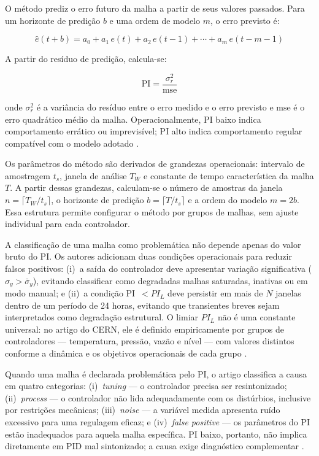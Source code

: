 O método prediz o erro futuro da malha a partir de seus valores passados. Para um horizonte de predição $b$ e uma ordem de modelo $m$, o erro previsto é:

\begin{equation}
	\hat{e}(t+b) = a_0 + a_1\,e(t) + a_2\,e(t-1) + \cdots + a_m\,e(t-m-1)
	\label{eq:pi_pred}
\end{equation}

A partir do resíduo de predição, calcula-se:

\begin{equation}
	\text{PI} = \frac{\sigma^2_r}{\text{mse}}
	\label{eq:pi_index}
\end{equation}

\noindent onde $\sigma^2_r$ é a variância do resíduo entre o erro medido e o erro previsto e
$\text{mse}$ é o erro quadrático médio da malha. Operacionalmente, PI baixo indica comportamento
errático ou imprevisível; PI alto indica comportamento regular compatível com o modelo adotado
\cite{Bradu2018}.

Os parâmetros do método são derivados de grandezas operacionais: intervalo de amostragem $t_s$, janela de análise $T_W$ e constante de tempo característica da malha $T$. A partir dessas grandezas, calculam-se o número de amostras da janela $n = \lceil T_W/t_s \rceil$, o horizonte de predição $b = \lceil T/t_s \rceil$ e a ordem do modelo $m = 2b$. Essa estrutura permite configurar o método por grupos de malhas, sem ajuste individual para cada controlador.

A classificação de uma malha como problemática não depende apenas do valor bruto do PI. Os autores adicionam duas condições operacionais para reduzir falsos positivos: (i)~a saída do controlador deve apresentar variação significativa ($\sigma_y > \bar{\sigma}_y$), evitando classificar como degradadas malhas saturadas, inativas ou em modo manual; e (ii)~a condição PI~$< PI_L$ deve persistir em mais de $N$ janelas dentro de um período de 24 horas, evitando que transientes breves sejam interpretados como degradação estrutural. O limiar $PI_L$ não é uma constante universal: no artigo do CERN, ele é definido empiricamente por grupos de controladores --- temperatura, pressão, vazão e nível --- com valores distintos conforme a dinâmica e os objetivos operacionais de cada grupo \cite{Bradu2018}.

Quando uma malha é declarada problemática pelo PI, o artigo classifica a causa em quatro categorias: (i)~\textit{tuning} --- o controlador precisa ser resintonizado; (ii)~\textit{process} --- o controlador não lida adequadamente com os distúrbios, inclusive por restrições mecânicas; (iii)~\textit{noise} --- a variável medida apresenta ruído excessivo para uma regulagem eficaz; e (iv)~\textit{false positive} --- os parâmetros do PI estão inadequados para aquela malha específica. PI baixo, portanto, não implica diretamente em PID mal sintonizado; a causa exige diagnóstico complementar \cite{Bradu2018}.

